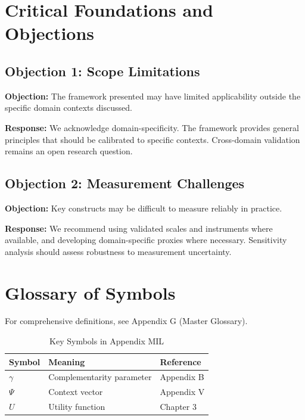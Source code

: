 


\section{Critical Foundations and Objections}
\label{sec:mil-foundations}

\subsection{Objection 1: Scope Limitations}

\textbf{Objection:} The framework presented may have limited applicability
outside the specific domain contexts discussed.

\textbf{Response:} We acknowledge domain-specificity. The framework provides
general principles that should be calibrated to specific contexts. Cross-domain
validation remains an open research question.

\subsection{Objection 2: Measurement Challenges}

\textbf{Objection:} Key constructs may be difficult to measure reliably in
practice.

\textbf{Response:} We recommend using validated scales and instruments where
available, and developing domain-specific proxies where necessary. Sensitivity
analysis should assess robustness to measurement uncertainty.



\section{Glossary of Symbols}
\label{sec:mil-glossary}

For comprehensive definitions, see Appendix G (Master Glossary).

\begin{table}[htbp]
\centering
\caption{Key Symbols in Appendix MIL}
\begin{tabular}{lll}
\toprule
\textbf{Symbol} & \textbf{Meaning} & \textbf{Reference} \\
\midrule
$\gamma$ & Complementarity parameter & Appendix B \\
$\Psi$ & Context vector & Appendix V \\
$U$ & Utility function & Chapter 3 \\
\bottomrule
\end{tabular}
\end{table}


